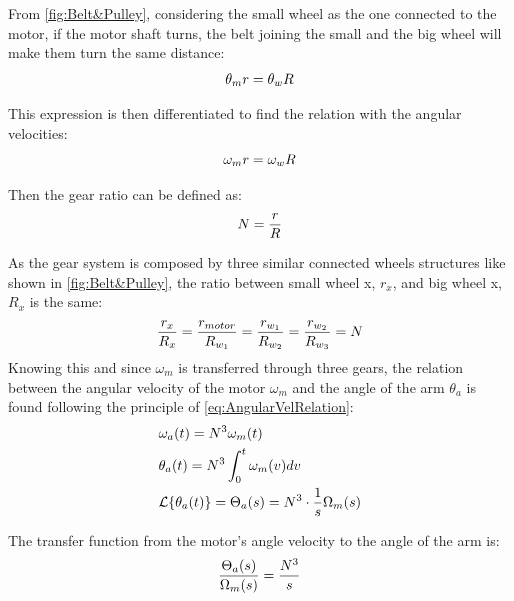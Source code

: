 From \autoref{fig:Belt&Pulley}, considering the small wheel as the one connected to the motor, if the motor shaft turns, the belt joining the small and the big wheel will make them turn the same distance:
\begin{equation}
	\theta_m r = \theta_w R \addunit{\meter}
\end{equation}

This expression is then differentiated to find the relation with the angular velocities:
\begin{equation}
	\omega_m r = \omega_w R\addunit{\meter\per\second}
	\label{eq:AngularVelRelation}
\end{equation}

Then the gear ratio can be defined as: 
\begin{equation}
	N = \frac{r}{R} \addunit{1}
	\label{eq:GearRatio}
\end{equation}

As the gear system is composed by three similar connected wheels structures like shown in \autoref{fig:Belt&Pulley}, the ratio between small wheel x, $r_x$, and big wheel x, $R_x$ is the same:
\begin{equation}
	\frac{r_x}{R_x} = \frac{r_{motor}}{R_{w_1}} = \frac{r_{w_1}}{R_{w_2}} = \frac{r_{w_2}}{R_{w_3}} = N \addunit{1}
\end{equation}
Knowing this and since $\omega_m$ is transferred through three gears, the relation between the angular velocity of the motor $\omega_m$ and the angle of the arm $\theta_a$ is found following the principle of \autoref{eq:AngularVelRelation}:
\begin{subequations} \label{eq:tech_ToA}
	\begin{flalign}
		&\omega_a(t) = N^3 \omega_m(t) \\
		&\theta_a(t) = N^3 \int_{0}^{t}\omega_m(v) dv \\
		&\mathcal{L}\{\theta_a(t)\} = \Theta_a(s) = N^3 \cdot \frac{1}{s} \Omega_m(s) \addunit{1}
	\end{flalign}
\end{subequations}

The transfer function from the motor's angle velocity to the angle of the arm is:
\begin{equation}\label{eq:thetaOmega}
	\frac{\Theta_a(s)}{\Omega_m(s)} =  \frac{N^3}{s} \addunit{1}
\end{equation}

